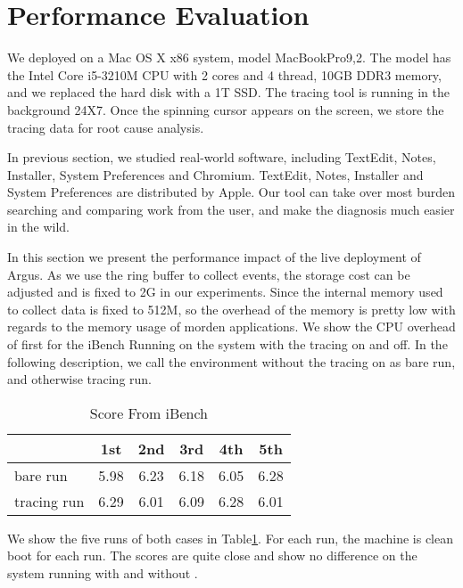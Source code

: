 \section{Performance Evaluation}
\label{sec:evaluation}
We deployed \xxx on a Mac OS X x86 system, model MacBookPro9,2.  The
model has the Intel Core i5-3210M CPU with 2 cores and 4 thread, 10GB DDR3
memory, and we replaced the hard disk with a 1T SSD.  The tracing tool is
running in the background 24X7.  Once the spinning cursor appears on the
screen, we store the tracing data for root cause analysis.

In previous section, we studied real-world software, including TextEdit,
Notes, Installer, System Preferences and Chromium. TextEdit, Notes, Installer and System
Preferences are distributed by Apple.  
Our tool can take over most burden searching and comparing work from the user,
and make the diagnosis much easier in the wild.

In this section we present the performance impact of the live deployment of Argus.
As we use the ring buffer to collect events, the storage cost can be adjusted
and is fixed to 2G in our experiments.
Since the internal memory used to collect data is fixed to 512M, so the overhead of the
memory is pretty low with regards to the memory usage of  morden applications.
We show the CPU overhead of \xxx first for the iBench Running on the system with the tracing
on and off. In the following description, we call the environment without the tracing on as
bare run, and otherwise tracing run.

\begin{table}[h]
\begin{tabular}{l|c|c|c|c|c}
\hline
 & 1st & 2nd & 3rd & 4th & 5th\\
\hline
 bare run & 5.98 & 6.23 & 6.18 & 6.05 & 6.28\\
\hline
 tracing run& 6.29 & 6.01 & 6.09 & 6.28 & 6.01\\
\hline
\end{tabular}
\caption{Score From iBench}
\label{tab:ibench}
\end{table}
We show the five runs of both cases in Table\ref{tab:ibench}.
For each run, the machine is clean boot for each run.
The scores are quite close and show no difference on the system running with and without \xxx.

